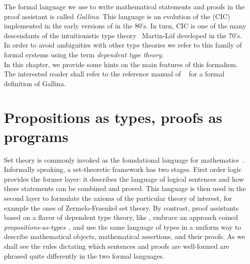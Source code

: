 The formal language we use to write
mathematical statements and proofs in the \Coq{} proof assistant
is called \emph{Gallina}.
This language is an evolution of the \emph{\mcbCIC{}}
(CIC)~\cite{coquand:huet:88,CoPa89} implemented
in the early versions of \Coq{} in the 80's. In turn, CIC is one of the many
descendants of the intuitionistic type theory~\cite{ITT} Martin-Löf developed in
the 70's. In order to avoid ambiguities with other type theories we refer to
this family of formal systems using the term \emph{dependent type theory}.\\
In this
chapter, we provide some hints on the main features of this
formalism. The interested reader shall refer to the reference manual
of \Coq{}~\cite{Coq:manual} for a formal definition of Gallina. %


\section{Propositions as types, proofs as programs}\label{sec:patpap}

Set theory is commonly invoked as the foundational language for
mathematics~\cite{bourbaki-sets}. Informally speaking, a
set-theoretic framework has two stages. First order logic provides
the former layer: it describes the language of logical sentences and how
these statements can be combined and proved. This language is then
used in the second layer to formulate the axioms of the particular
theory of interest, for example the ones of Zermelo-Fraenkel set theory.
By contrast, proof assistants based on a flavor of dependent
type theory, like \Coq{}, embrace an approach coined
\emph{propositions-as-types}~\cite{ch}, and use the same language of
types in a uniform way to describe mathematical objects, mathematical
assertions, and their proofs.
As we shall see the rules dictating which sentences and proofs
are well-formed are phrased quite differently in the two formal languages.


